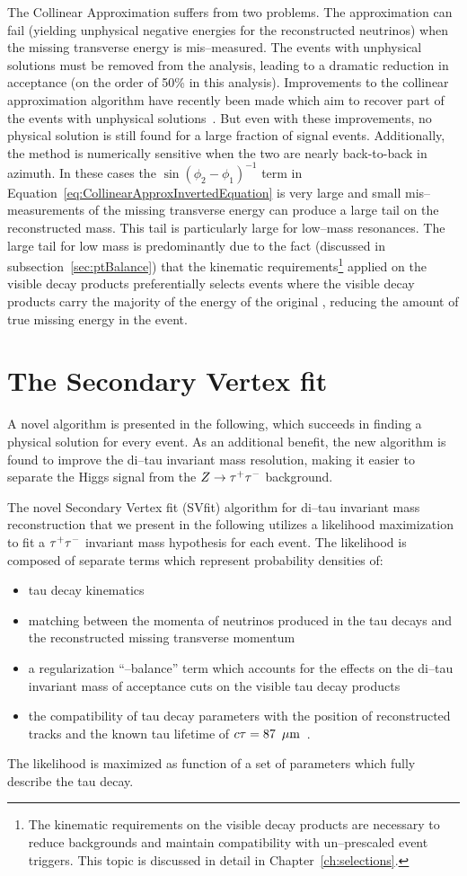The Collinear Approximation suffers from two problems.  The approximation can
fail (yielding unphysical negative energies for the reconstructed neutrinos)
when the missing transverse energy is mis--measured.  The events with unphysical
solutions must be removed from the analysis, leading to a dramatic reduction in
acceptance (on the order of 50\% in this analysis).  Improvements to the
collinear approximation algorithm have recently been made which aim to recover
part of the events with unphysical solutions~\cite{improvedCollinearApprox}.
But even with these improvements, no physical solution is still found for a
large fraction of signal events.  Additionally, the method is numerically
sensitive when the two \taul are nearly back-to-back in azimuth.  In these cases
the $\sin(\phi_2 - \phi_1)^{-1}$ term in
Equation~\ref{eq:CollinearApproxInvertedEquation} is very large and small
mis--measurements of the missing transverse energy can produce a large tail on
the reconstructed mass.  This tail is particularly large for low--mass
resonances.  The large tail for low mass is predominantly due to the fact
(discussed in subsection~\ref{sec:ptBalance}) that the kinematic
requirements\footnote{The kinematic requirements on the visible decay products
are necessary to reduce backgrounds and maintain compatibility with
un--prescaled event triggers.  This topic is discussed in detail in
Chapter~\ref{ch:selections}.} applied on the visible decay products
preferentially selects events where the visible decay products carry the
majority of the energy of the original \taul, reducing the amount of true
missing energy in the event.  

\section{The Secondary Vertex fit}
A novel algorithm is presented in the following, which succeeds in finding a
physical solution for every event.  As an additional benefit, the new algorithm
is found to improve the di--tau invariant mass resolution, making it easier to
separate the Higgs signal from the $Z\to\tau^+\tau^-$ background.

The novel Secondary Vertex fit (SVfit) algorithm for di--tau invariant mass
reconstruction that we present in the following utilizes a likelihood
maximization to fit a $\tau^+\tau^-$ invariant mass hypothesis for each
event.  The likelihood is composed of separate terms which represent probability
densities of:
\begin{itemize}
\item tau decay kinematics
\item matching between the momenta of neutrinos produced in the tau decays and
  the reconstructed missing transverse momentum
\item a regularization ``\pt--balance'' term which accounts for the effects on the di--tau invariant mass
 of acceptance cuts on the visible tau decay products
\item the compatibility of tau decay parameters with the position of reconstructed tracks
 and the known tau lifetime of $c\tau = 87~\,\mu\text{m}$~\cite{PDG}.
\end{itemize}
The likelihood is maximized as function of a set of parameters which fully describe the tau decay.

